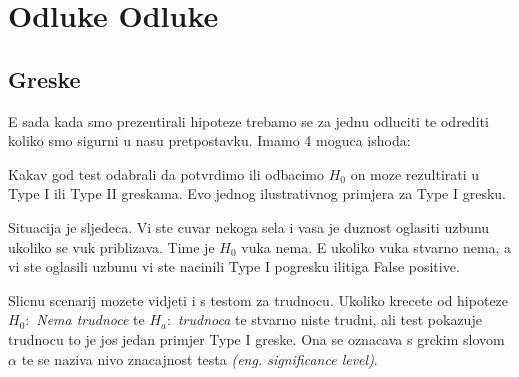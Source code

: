 \chapter{Odluke Odluke}

\section{Greske}

E sada kada smo prezentirali hipoteze trebamo se za jednu odluciti te odrediti koliko smo sigurni u nasu pretpostavku. Imamo 4 moguca ishoda:


\begin{table}[h]
\end{table}

Kakav god test odabrali da potvrdimo ili odbacimo $H_0$ on moze rezultirati u Type I ili Type II greskama. Evo jednog ilustrativnog primjera za Type I gresku.

Situacija je sljedeca. Vi ste cuvar nekoga sela i vasa je duznost oglasiti uzbunu ukoliko se vuk priblizava. Time je $H_0$ vuka nema. E ukoliko vuka stvarno nema, a vi ste oglasili uzbunu vi ste nacinili Type I pogresku ilitiga False positive.

Slicnu scenarij mozete vidjeti i s testom za trudnocu. Ukoliko krecete od hipoteze  $H_0:$ \emph{Nema trudnoce} te $H_a:$ \emph{trudnoca} te stvarno niste trudni, ali test pokazuje trudnocu to je jos jedan primjer Type I greske. Ona se oznacava s grckim slovom $\alpha$ te se naziva nivo znacajnost testa \textit{(eng. significance level)}.

